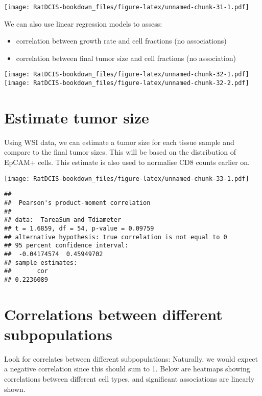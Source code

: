 \documentclass[
]{book}
\providecommand{\tightlist}{%
  \setlength{\itemsep}{0pt}\setlength{\parskip}{0pt}}
\begin{document}
\texttt{[image: RatDCIS-bookdown\_files/figure-latex/unnamed-chunk-31-1.pdf]}

We can also use linear regression models to assess:

\begin{itemize}
\tightlist
\item
  correlation between growth rate and cell fractions (no associations)
\item
  correlation between final tumor size and cell fractions (no association)
\end{itemize}

\texttt{[image: RatDCIS-bookdown\_files/figure-latex/unnamed-chunk-32-1.pdf]} \texttt{[image: RatDCIS-bookdown\_files/figure-latex/unnamed-chunk-32-2.pdf]}

\hypertarget{estimate-tumor-size}{%
\section{Estimate tumor size}\label{estimate-tumor-size}}

Using WSI data, we can estimate a tumor size for each tissue sample and compare to the final tumor sizes. This will be based on the distribution of EpCAM+ cells.
This estimate is also used to normalise CD8 counts earlier on.

\texttt{[image: RatDCIS-bookdown\_files/figure-latex/unnamed-chunk-33-1.pdf]}

\begin{verbatim}
## 
##  Pearson's product-moment correlation
## 
## data:  TareaSum and Tdiameter
## t = 1.6859, df = 54, p-value = 0.09759
## alternative hypothesis: true correlation is not equal to 0
## 95 percent confidence interval:
##  -0.04174574  0.45949702
## sample estimates:
##       cor 
## 0.2236089
\end{verbatim}

\hypertarget{correlations-between-different-subpopulations}{%
\section{Correlations between different subpopulations}\label{correlations-between-different-subpopulations}}

Look for correlates between different subpopulations: Naturally, we would expect a negative correlation since this should sum to 1. Below are heatmaps showing correlations between different cell types, and significant associations are linearly shown.
\end{document}
